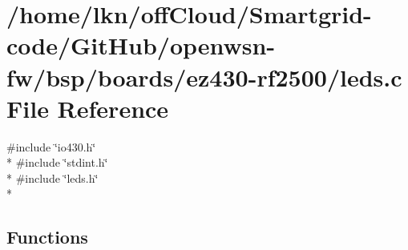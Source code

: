 \hypertarget{ez430-rf2500_2leds_8c}{}\section{/home/lkn/off\+Cloud/\+Smartgrid-\/code/\+Git\+Hub/openwsn-\/fw/bsp/boards/ez430-\/rf2500/leds.c File Reference}
\label{ez430-rf2500_2leds_8c}
{\ttfamily \#include \char`\"{}io430.\+h\char`\"{}}\\*
{\ttfamily \#include \char`\"{}stdint.\+h\char`\"{}}\\*
{\ttfamily \#include \char`\"{}leds.\+h\char`\"{}}\\*
\subsection*{Functions}

